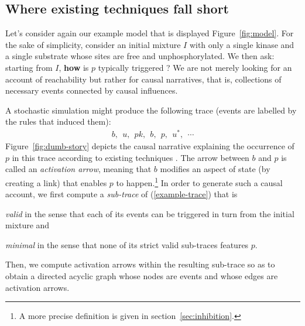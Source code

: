 





\subsection{Where existing techniques fall short}


Let's consider again our example model that is displayed
Figure~\ref{fig:model}.  For the sake of simplicity, consider an
initial mixture $I$ with only a single kinase and a single substrate
whose sites are free and unphosphorylated. We then ask: starting from
$I$, \textbf{how} is $p$ typically triggered ? We are not merely
looking for an account of reachability but rather for causal
narratives, that is, collections of necessary events connected by
causal influences.

A stochastic simulation might produce the following trace (events are
labelled by the rules that induced them):
\begin{align}\label{example-trace} b,\ \ u,\ \ pk,\ \ b,\ \ p,\ \
  u^{*},\ \ \cdots
\end{align} Figure~\ref{fig:dumb-story} depicts the causal narrative
explaining the occurrence of $p$ in this trace according to existing techniques
\cite{DBLP:conf/fsttcs/DanosFFHH12,DanosEtAl-CONCUR07}. The arrow
between $b$ and $p$ is called an \textit{activation arrow}, meaning
that $b$ modifies an aspect of state (by creating a link) that enables
$p$ to happen.\footnote{A more precise definition is given in section~\ref{sec:inhibition}.} In order to generate such a causal account, we first compute
a \emph{sub-trace} of (\ref{example-trace}) that is 
\begin{inparaenum}[i)]
\item \emph{valid} in the sense that each of its events can be
  triggered in turn from the initial mixture and
\item \emph{minimal} in the sense that none of its strict valid
  sub-traces features $p$.
\end{inparaenum}
Then, we compute activation arrows within the resulting sub-trace so
as to obtain a directed acyclic graph whose nodes are events and whose
edges are activation arrows.

